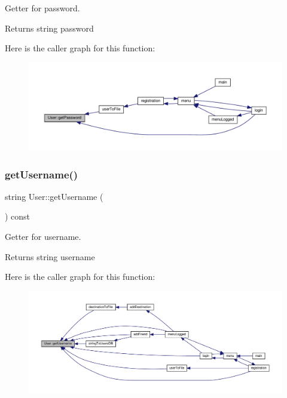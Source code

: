 Getter for password. \begin{DoxyReturn}{Returns}
string password 
\end{DoxyReturn}
Here is the caller graph for this function\+:\nopagebreak
\begin{figure}[H]
\begin{center}
\leavevmode
\includegraphics[width=350pt]{class_user_a33429bdd1253091697a9c5c5e1448bee_icgraph}
\end{center}
\end{figure}
\mbox{\label{class_user_a82e034043e04b2d750c654c8b2f2ce78}} 
\subsubsection{\texorpdfstring{get\+Username()}{getUsername()}}
{\footnotesize\ttfamily string User\+::get\+Username (\begin{DoxyParamCaption}{ }\end{DoxyParamCaption}) const\hspace{0.3cm}{\ttfamily [inline]}}

Getter for username. \begin{DoxyReturn}{Returns}
string username 
\end{DoxyReturn}
Here is the caller graph for this function\+:\nopagebreak
\begin{figure}[H]
\begin{center}
\leavevmode
\includegraphics[width=350pt]{class_user_a82e034043e04b2d750c654c8b2f2ce78_icgraph}
\end{center}
\end{figure}
\mbox{\label{class_user_a00fe82353b0ee8cf6abb1088d36e125b}} 
